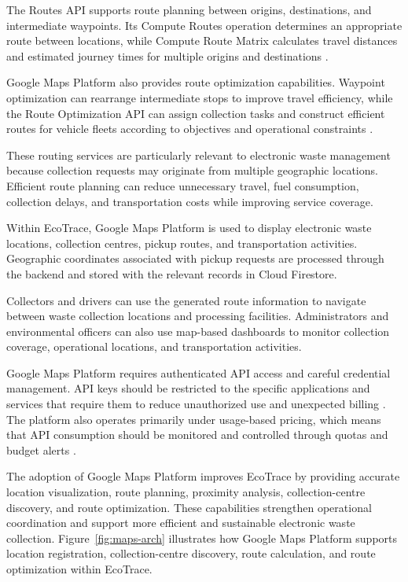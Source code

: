 The Routes API supports route planning between origins, destinations, and
intermediate waypoints. Its Compute Routes operation determines an appropriate
route between locations, while Compute Route Matrix calculates travel distances
and estimated journey times for multiple origins and destinations
\citep{google2026routes}.

Google Maps Platform also provides route optimization capabilities. Waypoint
optimization can rearrange intermediate stops to improve travel efficiency, while
the Route Optimization API can assign collection tasks and construct efficient
routes for vehicle fleets according to objectives and operational constraints
\citep{google2026optway,google2026routeopt}.

These routing services are particularly relevant to electronic waste
management because collection requests may originate from multiple geographic
locations. Efficient route planning can reduce unnecessary travel, fuel
consumption, collection delays, and transportation costs while improving service
coverage.

Within EcoTrace, Google Maps Platform is used to display electronic waste
locations, collection centres, pickup routes, and transportation activities.
Geographic coordinates associated with pickup requests are processed through
the backend and stored with the relevant records in Cloud Firestore.

Collectors and drivers can use the generated route information to navigate
between waste collection locations and processing facilities. Administrators and
environmental officers can also use map-based dashboards to monitor collection
coverage, operational locations, and transportation activities.

Google Maps Platform requires authenticated API access and careful credential
management. API keys should be restricted to the specific applications and
services that require them to reduce unauthorized use and unexpected billing
\citep{google2026bestpractices}. The platform also operates primarily under
usage-based pricing, which means that API consumption should be monitored
and controlled through quotas and budget alerts \citep{google2026pricing}.

The adoption of Google Maps Platform improves EcoTrace by providing
accurate location visualization, route planning, proximity analysis,
collection-centre discovery, and route optimization. These capabilities strengthen
operational coordination and support more efficient and sustainable electronic
waste collection. Figure~\ref{fig:maps-arch} illustrates how Google Maps Platform
supports location registration, collection-centre discovery, route calculation, and
route optimization within EcoTrace.

